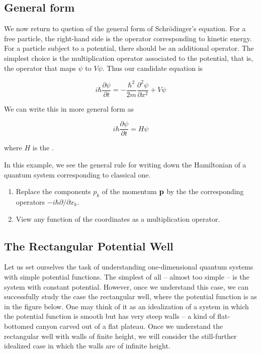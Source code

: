 \subsection{General form}

We now return to quetion of the general form of Schrödinger's equation. For  a free particle, the right-hand side is  the operator corresponding to kinetic energy.
For a particle subject to a potential, there should be an additional operator.  The simplest choice is the multiplication operator associated to the potential, that is, the operator that maps $\psi$ to $V\psi$.  Thus our candidate equation is

\begin{equation}
  i\hbar \frac{\partial \psi}{\partial t}
    =
  -\frac{ \hbar^2 }{2m}\frac{ \partial^2 \psi}{ \partial x^2 }
   + V\psi
\end{equation}

We can write this in more general form as

\begin{equation}
  i\hbar \frac{\partial \psi}{\partial t}
    =
  H\psi
\end{equation}

where $H$ is the .

In this example, we see the general rule for writing down the Hamiltonian of a quantum system corresponding to classical one.

\begin{enumerate}
\item Replace the components $p_k$ of the momentum $\bf{p}$ by the the corresponding operators $-i\hbar \partial/\partial x_k$.

\item View any function of the coordinates as a multiplication operator.
\end{enumerate}

\subsection{The Rectangular Potential Well}


Let us set ourselves the task of understanding one-dimensional quantum systems with simple potential functions.  The simplest of all -- almost too simple -- is the system with constant potential.  However, once we understand this case, we can successfully study the case the rectangular well, where the potential function is as in the figure below.  One may think of it as an idealization of a system in which the potential function is smooth but has very steep walls -- a kind of flat-bottomed canyon carved out of a flat plateau.  Once we understand the rectangular well with walls of finite height, we will consider the still-further idealized case in which the walls are of infinite height.


